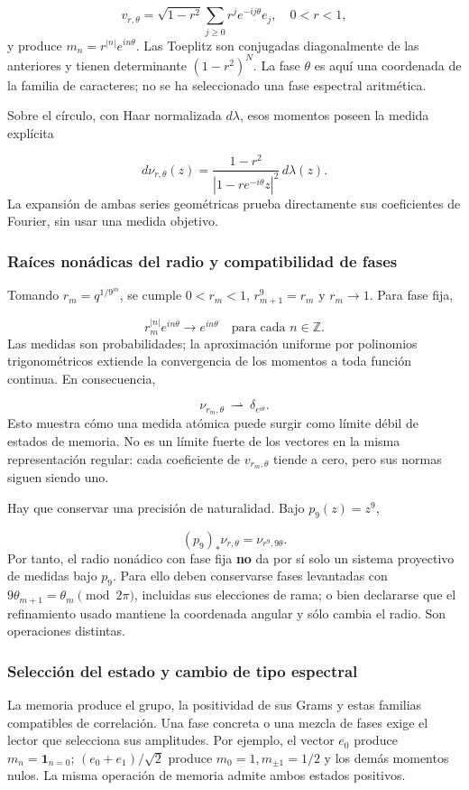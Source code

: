 \[
v_{r,\theta}=\sqrt{1-r^2}\sum_{j\ge0}r^j e^{-ij\theta}e_j,
\quad 0<r<1,
\]
y produce \(m_n=r^{|n|}e^{in\theta}\). Las Toeplitz son conjugadas diagonalmente de las anteriores y tienen determinante \((1-r^2)^N\). La fase \(\theta\) es aquí una coordenada de la familia de caracteres; no se ha seleccionado una fase espectral aritmética.

Sobre el círculo, con Haar normalizada \(d\lambda\), esos momentos poseen la medida explícita

\[
d\nu_{r,\theta}(z)
=\frac{1-r^2}{|1-r e^{-i\theta}z|^2}\,d\lambda(z).
\]
La expansión de ambas series geométricas prueba directamente sus coeficientes de Fourier, sin usar una medida objetivo.


\subsubsection{Raíces nonádicas del radio y compatibilidad de fases}
\label{viii:tm-add-m3-1}
Tomando \(r_m=q^{1/9^m}\), se cumple \(0<r_m<1\), \(r_{m+1}^{9}=r_m\) y \(r_m\to1\). Para fase fija,

\[
r_m^{|n|}e^{in\theta}\longrightarrow e^{in\theta}
\quad\text{para cada }n\in\mathbb Z.
\]
Las medidas son probabilidades; la aproximación uniforme por polinomios trigonométricos extiende la convergencia de los momentos a toda función continua. En consecuencia,

\[
\nu_{r_m,\theta}\ \rightharpoonup\ \delta_{e^{i\theta}}.
\]
Esto muestra cómo una medida atómica puede surgir como límite débil de estados de memoria. No es un límite fuerte de los vectores en la misma representación regular: cada coeficiente de \(v_{r_m,\theta}\) tiende a cero, pero sus normas siguen siendo uno.

Hay que conservar una precisión de naturalidad. Bajo \(p_9(z)=z^9\),

\[
(p_9)_*\nu_{r,\theta}=\nu_{r^9,9\theta}.
\]
Por tanto, el radio nonádico con fase fija \textbf{no} da por sí solo un sistema proyectivo de medidas bajo \(p_9\). Para ello deben conservarse fases levantadas con \(9\theta_{m+1}=\theta_m\pmod{2\pi}\), incluidas sus elecciones de rama; o bien declararse que el refinamiento usado mantiene la coordenada angular y sólo cambia el radio. Son operaciones distintas.


\subsubsection{Selección del estado y cambio de tipo espectral}
\label{viii:tm-add-m3-2}
La memoria produce el grupo, la positividad de sus Grams y estas familias compatibles de correlación. Una fase concreta o una mezcla de fases exige el lector que selecciona sus amplitudes. Por ejemplo, el vector \(e_0\) produce \(m_n=\mathbf1_{n=0}\); \((e_0+e_1)/\sqrt2\) produce \(m_0=1,m_{\pm1}=1/2\) y los demás momentos nulos. La misma operación de memoria admite ambos estados positivos.


